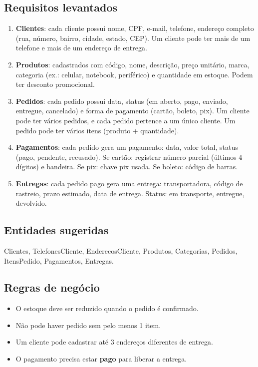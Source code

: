 \documentclass[12pt,a4paper]{article}
\begin{document}
\subsection*{Requisitos levantados}
\begin{enumerate}
    \item \textbf{Clientes}: cada cliente possui nome, CPF, e-mail, telefone, endereço completo (rua, número, bairro, cidade, estado, CEP). Um cliente pode ter mais de um telefone e mais de um endereço de entrega.
    \item \textbf{Produtos}: cadastrados com código, nome, descrição, preço unitário, marca, categoria (ex.: celular, notebook, periférico) e quantidade em estoque. Podem ter desconto promocional.
    \item \textbf{Pedidos}: cada pedido possui data, status (em aberto, pago, enviado, entregue, cancelado) e forma de pagamento (cartão, boleto, pix). Um cliente pode ter vários pedidos, e cada pedido pertence a um único cliente. Um pedido pode ter vários itens (produto + quantidade).
    \item \textbf{Pagamentos}: cada pedido gera um pagamento: data, valor total, status (pago, pendente, recusado). Se cartão: registrar número parcial (últimos 4 dígitos) e bandeira. Se pix: chave pix usada. Se boleto: código de barras.
    \item \textbf{Entregas}: cada pedido pago gera uma entrega: transportadora, código de rastreio, prazo estimado, data de entrega. Status: em transporte, entregue, devolvido.
\end{enumerate}

\subsection*{Entidades sugeridas}
Clientes, TelefonesCliente, EnderecosCliente, Produtos, Categorias, Pedidos, ItensPedido, Pagamentos, Entregas.

\subsection*{Regras de negócio}
\begin{itemize}
    \item O estoque deve ser reduzido quando o pedido é confirmado.
    \item Não pode haver pedido sem pelo menos 1 item.
    \item Um cliente pode cadastrar até 3 endereços diferentes de entrega.
    \item O pagamento precisa estar \textbf{pago} para liberar a entrega.
\end{itemize}
\end{document}
